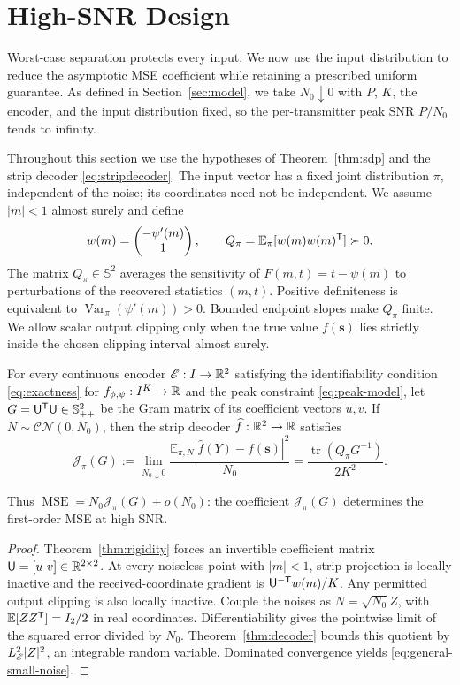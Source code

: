 \section{High-SNR Design}\label{sec:pareto}
Worst-case separation protects every input. We now use the input distribution to reduce the asymptotic MSE coefficient while retaining a prescribed uniform guarantee. As defined in Section~\ref{sec:model}, we take $N_0\downarrow0$ with $P$, $K$, the encoder, and the input distribution fixed, so the per-transmitter peak SNR $P/N_0$ tends to infinity.

Throughout this section we use the hypotheses of Theorem~\ref{thm:sdp} and the strip decoder \eqref{eq:stripdecoder}. The input vector has a fixed joint distribution $\pi$, independent of the noise; its coordinates need not be independent. We assume $|m|<1$ almost surely and define
\begin{equation}
 w(m)=\begin{pmatrix}-\psi'(m)\\1\end{pmatrix},\qquad
 Q_\pi=\mathbb E_\pi[w(m)w(m)^\mathsf T]\succ0.
 \label{eq:prior-matrix}
\end{equation}
The matrix $Q_\pi\in\mathbb S^2$ averages the sensitivity of $F(m,t)=t-\psi(m)$ to perturbations of the recovered statistics $(m,t)$. Positive definiteness is equivalent to $\operatorname{Var}_\pi(\psi'(m))>0$. Bounded endpoint slopes make $Q_\pi$ finite. We allow scalar output clipping only when the true value $f(\mathbf s)$ lies strictly inside the chosen clipping interval almost surely.

\begin{proposition}\label{prop:general-small-noise}
For every continuous encoder $\mathscr E:I\to\mathbb R^2$ satisfying the identifiability condition \eqref{eq:exactness} for $f_{\phi,\psi}:I^K\to\mathbb R$ and the peak constraint \eqref{eq:peak-model}, let $G=\mathsf U^\mathsf T\mathsf U\in\mathbb S_{++}^2$ be the Gram matrix of its coefficient vectors $u,v$. If $N\sim\mathcal{CN}(0,N_0)$, then the strip decoder $\widehat f:\mathbb R^2\to\mathbb R$ satisfies
\begin{equation}
 \mathcal J_\pi(G):=\lim_{N_0\downarrow0}
 \frac{\mathbb E_{\pi,N}|\widehat f(Y)-f(\mathbf s)|^2}{N_0}
 =\frac{\operatorname{tr}(Q_\pi G^{-1})}{2K^2}.
 \label{eq:general-small-noise}
\end{equation}
\end{proposition}
Thus $\operatorname{MSE}=N_0\mathcal J_\pi(G)+o(N_0)$: the coefficient $\mathcal J_\pi(G)$ determines the first-order MSE at high SNR.
\begin{proof}
Theorem~\ref{thm:rigidity} forces an invertible coefficient matrix $\mathsf U=[u\ v]\in\R^{2\times2}$. At every noiseless point with $|m|<1$, strip projection is locally inactive and the received-coordinate gradient is $\mathsf U^{-\mathsf T}w(m)/K$. Any permitted output clipping is also locally inactive. Couple the noises as $N=\sqrt{N_0}Z$, with $\mathbb E[ZZ^\mathsf T]=I_2/2$ in real coordinates. Differentiability gives the pointwise limit of the squared error divided by $N_0$. Theorem~\ref{thm:decoder} bounds this quotient by $L_\mathscr E^2|Z|^2$, an integrable random variable. Dominated convergence yields \eqref{eq:general-small-noise}.
\end{proof}


